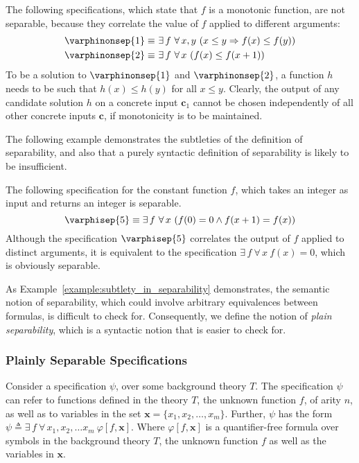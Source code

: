 \begin{example}
The following specifications, which state that $f$ is a monotonic
function, are not separable, because they correlate
the value of $f$ applied to different arguments:
\begin{align*}
\varphinonsep{1} \equiv\ & \exists\,f\ \forall\,x, y\ (x \le y \Rightarrow
f(x) \le f(y))\\
\varphinonsep{2} \equiv\ & \exists\,f\ \forall\,x\ (f(x) \le f(x + 1))
\end{align*}
To be a solution to $\varphinonsep{1}$ and $\varphinonsep{2}$, a
function $h$ needs to be such that $h(x) \leq h(y)$ for all $x \leq
y$. Clearly, the output of any candidate solution $h$ on a concrete
input $\mathbf{c}_1$ cannot be chosen independently of all other
concrete inputs $\mathbf{c}$, if monotonicity is to be maintained.
\end{example}
The following example demonstrates the subtleties of the definition of
separability, and also that a purely syntactic definition of
separability is likely to be insufficient.
\begin{example}
The following specification for the constant function $f$, which takes
an integer as input and returns an integer is separable.
\begin{equation*}
\varphisep{5} \equiv \exists\,f\ \forall\,x\ (f(0) = 0 \wedge f(x + 1)
= f(x))
\end{equation*}
Although the specification $\varphisep{5}$ correlates the output of
$f$ applied to distinct arguments, it is equivalent to the
specification $\exists\,f\ \forall\,x\ f(x) = 0$, which is obviously
separable.
\label{example:subtlety_in_separability}
\end{example}
\noindent
As Example~\ref{example:subtlety_in_separability} demonstrates,
the semantic notion of separability, which could involve arbitrary
equivalences between formulas, is difficult to check
for. Consequently, we define the notion of \emph{plain separability},
which is a syntactic notion that is easier to check for.

\subsubsection{Plainly Separable Specifications}
Consider a \sygusbody specification $\psi$, over some background
theory $T$. The specification $\psi$ can refer to functions defined in
the theory $T$, the unknown function $f$, of arity $n$, as well as to
variables in the set $\mathbf{x} = \{x_1, x_2, \ldots,
x_m\}$. Further, $\psi$ has the form $\psi \triangleq \exists\,f\
\forall\,x_1, x_2, \ldots x_m\ \varphi[f, \mathbf{x}]$. Where
$\varphi[f, \mathbf{x}]$ is a quantifier-free formula over symbols in
the background theory $T$, the unknown function $f$ as well as the
variables in $\mathbf{x}$.

